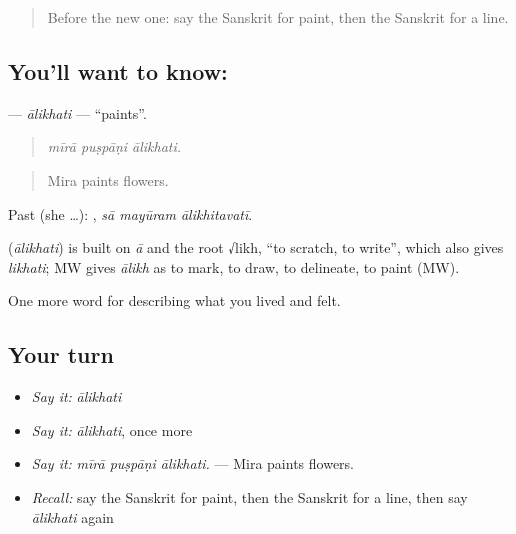 \label{lesson:SA-C518-alikhati}



\begin{quote}
Before the new one: say the Sanskrit for paint, then the Sanskrit for a line.
\end{quote}

\subsection*{You'll want to know: }
\textbf{} — \emph{ālikhati} — \textquotedblleft{}paints\textquotedblright{}.

\begin{quote}
  
\end{quote}

\begin{quote}
\emph{mīrā puṣpāṇi ālikhati.}
\end{quote}

\begin{quote}
Mira paints flowers.
\end{quote}

Past (she …):   , \emph{sā mayūram ālikhitavatī}.

\begin{cousinweb}
\textbf{} (\emph{ālikhati}) is built on \emph{ā} and the root √likh, \textquotedblleft{}to scratch, to write\textquotedblright{}, which also gives \emph{likhati}; MW gives \emph{ālikh} as to mark, to draw, to delineate, to paint (MW).
\end{cousinweb}

\begin{grammarlens}[title={What you've built}]
One more word for describing what you lived and felt.
\end{grammarlens}

\subsection*{Your turn}
\begin{itemize}
\raggedright
  \item \emph{Say it:} \emph{ālikhati}
  \item \emph{Say it:} \emph{ālikhati}, once more
  \item \emph{Say it:} \emph{mīrā puṣpāṇi ālikhati.} — Mira paints flowers.
  \item \emph{Recall:} say the Sanskrit for paint, then the Sanskrit for a line, then say \emph{ālikhati} again
\end{itemize}

